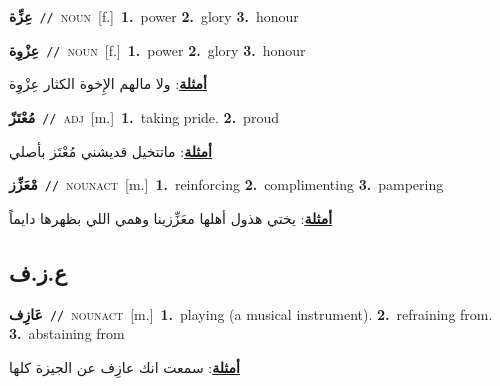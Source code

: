 \documentclass[10pt,a4paper,twoside]{article} %
\begin{document}
\begin{multicols}{2}
{\setlength\topsep{0pt}\textbf{\foreignlanguage{arabic}{عِزِّة}}\ {\color{gray}\texttt{//}\color{black}}\ \textsc{noun}\ [f.]\ \textbf{1.}~power  \textbf{2.}~glory  \textbf{3.}~honour\ } \vspace{2mm}

{\setlength\topsep{0pt}\textbf{\foreignlanguage{arabic}{عِزْوِة}}\ {\color{gray}\texttt{//}\color{black}}\ \textsc{noun}\ [f.]\ \textbf{1.}~power  \textbf{2.}~glory  \textbf{3.}~honour\  \begin{flushright}\color{gray}\foreignlanguage{arabic}{\textbf{\underline{\foreignlanguage{arabic}{أمثلة}}}: ولا مالهم الإِخوة الكثار عِزْوِة}\end{flushright}\color{black}} \vspace{2mm}

{\setlength\topsep{0pt}\textbf{\foreignlanguage{arabic}{مُعْتَزّ}}\ {\color{gray}\texttt{//}\color{black}}\ \textsc{adj}\ [m.]\ \textbf{1.}~taking pride.  \textbf{2.}~proud\  \begin{flushright}\color{gray}\foreignlanguage{arabic}{\textbf{\underline{\foreignlanguage{arabic}{أمثلة}}}: ماتتخيل قديشني مُعْتَز بأصلي}\end{flushright}\color{black}} \vspace{2mm}

{\setlength\topsep{0pt}\textbf{\foreignlanguage{arabic}{مْعَزِّز}}\ {\color{gray}\texttt{//}\color{black}}\ \textsc{noun\textunderscore act}\ [m.]\ \textbf{1.}~reinforcing  \textbf{2.}~complimenting  \textbf{3.}~pampering\  \begin{flushright}\color{gray}\foreignlanguage{arabic}{\textbf{\underline{\foreignlanguage{arabic}{أمثلة}}}: يختي هذول أهلها معَزِّزينا وهمي اللي بظهرها دايماً}\end{flushright}\color{black}} \vspace{2mm}

\vspace{-3mm}
\subsection*{\color{blue}\foreignlanguage{arabic}{ع.ز.ف}\color{blue}{}} 

{\setlength\topsep{0pt}\textbf{\foreignlanguage{arabic}{عَازِف}}\ {\color{gray}\texttt{//}\color{black}}\ \textsc{noun\textunderscore act}\ [m.]\ \textbf{1.}~playing (a musical instrument).  \textbf{2.}~refraining from.  \textbf{3.}~abstaining from\  \begin{flushright}\color{gray}\foreignlanguage{arabic}{\textbf{\underline{\foreignlanguage{arabic}{أمثلة}}}: سمعت انك عازِف عن الجيزة كلها}\end{flushright}\color{black}} \vspace{2mm}


\end{multicols}
\end{document}
